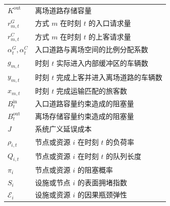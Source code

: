 \documentclass[UTF8,a4paper,11pt,onecolumn,fontset=none]{ctexart}
\begin{document}
\begin{table}[H]
\begin{tabularx}{\textwidth}{>{\centering\arraybackslash}p{}>{\raggedright\arraybackslash}X}
    $K^{\mathrm{out}}$ & 离场道路存储容量 \\
    $r_{m,t}^{G}$ & 方式 $m$ 在时刻 $t$ 的入口请求量 \\
    $r_{m,t}^{C}$ & 方式 $m$ 在时刻 $t$ 的上客请求量 \\
    $\alpha_t^G,\alpha_t^C$ & 入口道路与离场空间的比例分配系数 \\
    $g_{m,t}$ & 时刻 $t$ 实际进入内部缓冲区的车辆数 \\
    $y_{m,t}$ & 时刻 $t$ 完成上客并进入离场道路的车辆数 \\
    $x_{m,t}$ & 时刻 $t$ 完成运输匹配的旅客数 \\
    $B_t^{\mathrm{in}}$ & 入口道路容量约束造成的阻塞量 \\
    $B_t^{\mathrm{out}}$ & 离场存储容量约束造成的阻塞量 \\
    $J$ & 系统广义延误成本 \\
    $\rho_{i,t}$ & 节点或资源 $i$ 在时刻 $t$ 的负荷率 \\
    $Q_{i,t}$ & 节点或资源 $i$ 在时刻 $t$ 的队列长度 \\
    $\pi_i$ & 节点或资源 $i$ 的阻塞概率 \\
    $S_i$ & 设施或节点 $i$ 的表面拥堵指数 \\
    $\mathcal E_i$ & 设施或资源 $i$ 的因果瓶颈弹性 \\
    \bottomrule
  \end{tabularx}
\end{table}
\end{document}

